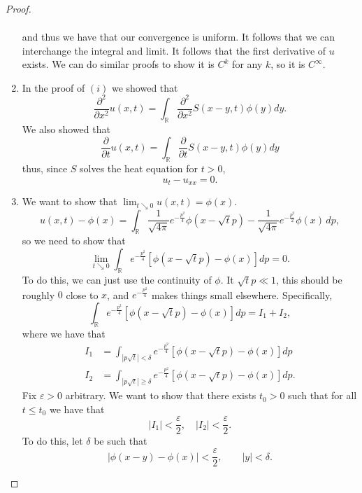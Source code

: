 \begin{proof}
\begin{enumerate}
\begin{align*}
			\end{align*}
			and thus we have that our convergence is uniform. It follows that we can interchange the integral and limit. It follows that the first derivative of \( u \) exists. We can do similar proofs to show it is \( C^{k} \) for any \( k \), so it is \( C^{\infty} \).
		\item In the proof of \( (i) \) we showed that
			\[ \frac{\partial^{2}}{\partial x^{2}} u(x, t) = \int_{\mathbb{R}} \frac{\partial^{2}}{\partial x^{2}} S(x - y, t) \phi(y) dy. \]
			We also showed that
			\[ \frac{\partial}{\partial t} u(x, t) = \int_{\mathbb{R}}  \frac{\partial}{\partial t}S(x - y, t) \phi(y) dy \]
			thus, since \( S \) solves the heat equation for \( t > 0 \),
			\[ u_{t} - u_{x x} = 0. \]

			\item We want to show that \( \lim_{t \searrow 0} u(x, t) = \phi(x) \).
				\[ u(x, t) - \phi(x) = \int_{\mathbb{R}} \frac{1}{\sqrt{4 \pi}}e^{- \frac{p^{2}}{4}} \phi(x - \sqrt{t}p) - \frac{1}{\sqrt{4 \pi}} e^{-\frac{p^{2}}{2}} \phi(x) \, dp, \]
				so we need to show that
				\[ \lim_{t \searrow 0} \int_{\mathbb{R}} e^{- \frac{p^{2}}{4}} \left[ \phi(x - \sqrt{t}p) - \phi(x) \right] dp = 0. \]
				To do this, we can just use the continuity of \( \phi \). It \( \sqrt{t}p \ll 1 \), this should be roughly \( 0 \) close to \( x \), and \( e^{- \frac{p^{2}}{4}} \) makes things small elsewhere. Specifically, 
				\[ \int_{\mathbb{R}} e^{- \frac{p^{2}}{4}} \left[ \phi(x - \sqrt{t}p) - \phi(x) \right] dp = I_{1} + I_{2}, \]
				where we have that
				\begin{align*}
					I_{1} &= \int_{|p \sqrt{t}| < \delta} e^{- \frac{p^{2}}{4}} \left[ \phi(x - \sqrt{t}p) - \phi(x) \right] dp \\
					I_{2} &= \int_{|p \sqrt{t}| \ge \delta} e^{- \frac{p^{2}}{4}}\left[ \phi(x - \sqrt{t}p) - \phi(x) \right] dp.
				\end{align*}
				Fix \( \varepsilon > 0 \) arbitrary. We want to show that there exists \( t_{0} > 0 \) such that for all \( t \le t_{0} \) we have that
				\[ |I_{1}| < \frac{\varepsilon}{2}, \quad |I_{2}| < \frac{\varepsilon}{2}. \]
				To do this, let \( \delta \) be such that
				\[ | \phi(x - y) - \phi(x)| < \frac{\varepsilon}{2}, \qquad |y| < \delta. \]
				\begin{enumerate}
				

\end{enumerate}
\end{enumerate}
\end{proof}
